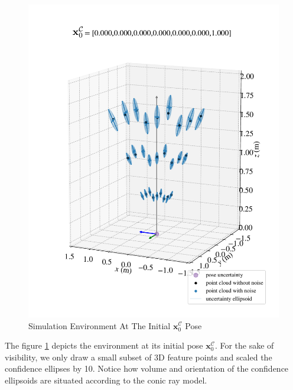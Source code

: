 \documentclass[a4paper]{report}
\numberwithin{figure}{section}
\begin{document}
\begin{figure}[H]
  \centering
  \includegraphics[width=\linewidth,natwidth=640,natheight=640]
  {fig/eva_graphs/sim_at_p0_edit.pdf}
  \caption[Simulation Environment At The Initial Pose]
  {Simulation Environment At The Initial $\mathbf{x}_0^{\mathcal{C}}$ Pose}
	\label{fig:sim_at_p0}
\end{figure}

The figure \ref{fig:sim_at_p0} depicts the environment at its initial pose 
$\mathbf{x}_0^{\mathcal{C}}$.
For the sake of visibility, we only draw a small subset of 3D feature points and scaled the 
confidence ellipses by 10. Notice how 
volume and orientation of the confidence ellipsoids are situated according to 
the conic ray model.
\end{document}
